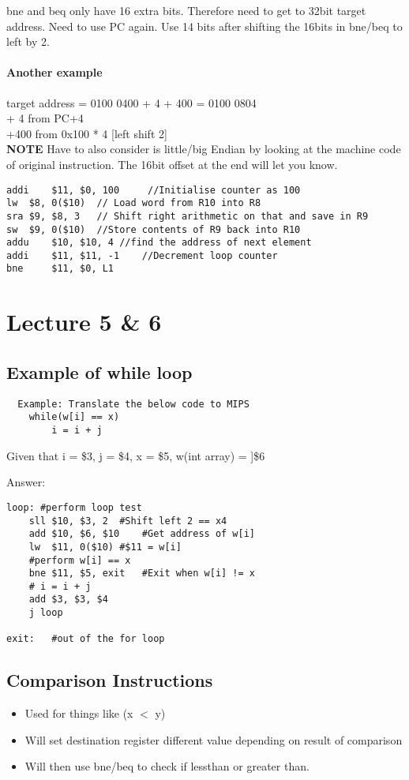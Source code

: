 \documentclass{article}
\begin{document}
	bne and beq only have 16 extra bits. Therefore need to get to 32bit target address. Need to use PC again. Use 14 bits after shifting the 16bits in bne/beq to left by 2.

	\paragraph{Another example}
	target address = 0100 0400 + 4  + 400 = 0100 0804 \\
	+ 4 from PC+4 \\
	+400 from 0x100 * 4 [left shift 2] \\
	\textbf{NOTE} Have to also consider is little/big Endian by looking at the machine code of original instruction. The 16bit offset at the end will let you know.

	\begin{lstlisting}
addi 	$11, $0, 100	 //Initialise counter as 100
lw 	$8, 0($10)	// Load word from R10 into R8
sra	$9, $8, 3	// Shift right arithmetic on that and save in R9
sw 	$9, 0($10)	//Store contents of R9 back into R10
addu 	$10, $10, 4	//find the address of next element
addi 	$11, $11, -1	//Decrement loop counter
bne 	$11, $0, L1
	\end{lstlisting}

\section{Lecture 5 \& 6}
	\subsection*{Example of while loop}
	\begin{lstlisting}
  Example: Translate the below code to MIPS
	while(w[i] == x)
		i = i + j
	\end{lstlisting}

	Given that i = \$3, j = \$4, x = \$5, w(int array) = ]\$6

	Answer:
	\begin{lstlisting}
loop: #perform loop test
	sll	$10, $3, 2	#Shift left 2 == x4
	add $10, $6, $10	#Get address of w[i]
	lw	$11, 0($10)	#$11 = w[i]
	#perform w[i] == x
	bne $11, $5, exit	#Exit when w[i] != x
	# i = i + j
	add $3, $3, $4
	j loop

exit:	#out of the for loop
	\end{lstlisting}

	\subsection*{Comparison Instructions}
	\begin{itemize}
		\item Used for things like (x $<$ y)
		\item Will set destination register different value depending on result of comparison
		\item Will then use bne/beq to check if lessthan or greater than.
	\end{itemize}
\end{document}
